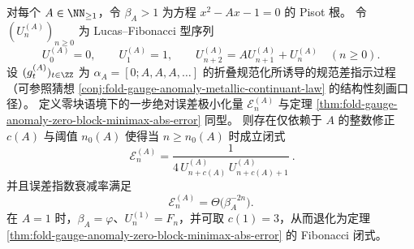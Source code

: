 \begin{conjecture}\label{conj:ostrowski-metallic-lucas-ostrowski-memory-law}
对每个 \(A\in\NN_{\ge 1}\)，令 \(\beta_A>1\) 为方程 \(x^2-Ax-1=0\) 的 Pisot 根。
令 \((U^{(A)}_n)_{n\ge 0}\) 为 Lucas--Fibonacci 型序列
\[
U^{(A)}_0=0,\qquad U^{(A)}_1=1,\qquad U^{(A)}_{n+2}=A U^{(A)}_{n+1}+U^{(A)}_{n}\quad(n\ge 0).
\]
设 \((g^{(A)}_t)_{t\in\ZZ}\) 为 \(\alpha_A=[0;A,A,A,\dots]\) 的折叠规范化所诱导的规范差指示过程（可参照猜想 \ref{conj:fold-gauge-anomaly-metallic-continuant-law} 的结构性刻画口径）。
定义零块语境下的一步绝对误差极小化量 \(\mathcal E^{(A)}_n\) 与定理 \ref{thm:fold-gauge-anomaly-zero-block-minimax-abs-error} 同型。
则存在仅依赖于 \(A\) 的整数修正 \(c(A)\) 与阈值 \(n_0(A)\) 使得当 \(n\ge n_0(A)\) 时成立闭式
\[
\boxed{\ \mathcal E^{(A)}_n=\frac{1}{4\,U^{(A)}_{n+c(A)}\,U^{(A)}_{n+c(A)+1}}\ }.
\]
并且误差指数衰减率满足
\[
\mathcal E^{(A)}_n=\Theta\!\bigl(\beta_A^{-2n}\bigr).
\]
在 \(A=1\) 时，\(\beta_A=\varphi\)、\(U^{(1)}_n=F_n\)，并可取 \(c(1)=3\)，从而退化为定理 \ref{thm:fold-gauge-anomaly-zero-block-minimax-abs-error} 的 Fibonacci 闭式。
\end{conjecture}

\endinput
